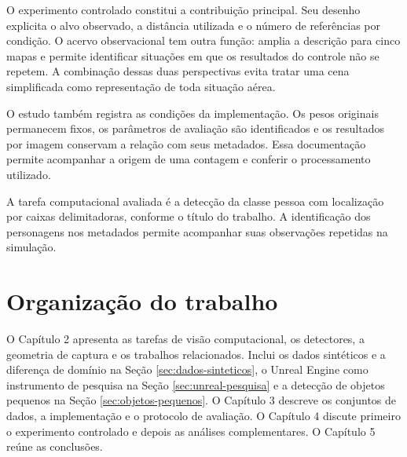 O experimento controlado constitui a contribuição principal. Seu desenho explicita o alvo observado, a distância utilizada e o número de referências por condição. O acervo observacional tem outra função: amplia a descrição para cinco mapas e permite identificar situações em que os resultados do controle não se repetem. A combinação dessas duas perspectivas evita tratar uma cena simplificada como representação de toda situação aérea.

O estudo também registra as condições da implementação. Os pesos originais permanecem fixos, os parâmetros de avaliação são identificados e os resultados por imagem conservam a relação com seus metadados. Essa documentação permite acompanhar a origem de uma contagem e conferir o processamento utilizado.

A tarefa computacional avaliada é a detecção da classe pessoa com localização por caixas delimitadoras, conforme o título do trabalho. A identificação dos personagens nos metadados permite acompanhar suas observações repetidas na simulação.

\section{Organização do trabalho}
O Capítulo 2 apresenta as tarefas de visão computacional, os detectores, a geometria de captura e os trabalhos relacionados. Inclui os dados sintéticos e a diferença de domínio na Seção \ref{sec:dados-sinteticos}, o Unreal Engine como instrumento de pesquisa na Seção \ref{sec:unreal-pesquisa} e a detecção de objetos pequenos na Seção \ref{sec:objetos-pequenos}. O Capítulo 3 descreve os conjuntos de dados, a implementação e o protocolo de avaliação. O Capítulo 4 discute primeiro o experimento controlado e depois as análises complementares. O Capítulo 5 reúne as conclusões.
